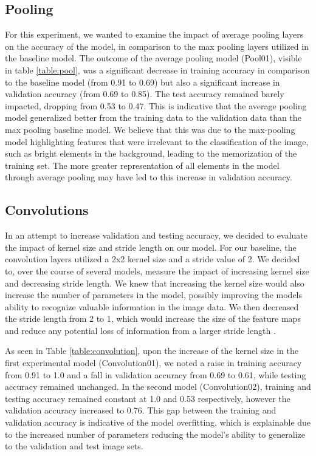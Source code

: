 \documentclass{article}
\begin{document}
\subsection{Pooling}

For this experiment, we wanted to examine the impact of average pooling layers on the accuracy of the model, in comparison to the max pooling layers utilized in the baseline model. The outcome of the average pooling model (Pool01), visible in table \ref{table:pool}, was a significant decrease in training accuracy in comparison to the baseline model (from 0.91 to 0.69) but also a significant increase in validation accuracy (from 0.69 to 0.85). The test accuracy remained barely impacted, dropping from 0.53 to 0.47. This is indicative that the average pooling model generalized better from the training data to the validation data than the max pooling baseline model. We believe that this was due to the max-pooling model highlighting features that were irrelevant to the classification of the image, such as bright elements in the background, leading to the memorization of the training set. The more greater representation of all elements in the model through average pooling may have led to this increase in validation accuracy.

\subsection{Convolutions}

In an attempt to increase validation and testing accuracy, we decided to evaluate the impact of kernel size and stride length on our model. For our baseline, the convolution layers utilized a 2x2 kernel size and a stride value of 2. We decided to, over the course of several models, measure the impact of increasing kernel size and decreasing stride length. We knew that increasing the kernel size would also increase the number of parameters in the model, possibly improving the models ability to recognize valuable information in the image data. We then decreased the stride length from 2 to 1, which would increase the size of the feature maps and reduce any potential loss of information from a larger stride length \cite{Goodfellow-et-al-2016}.

As seen in Table \ref{table:convolution}, upon the increase of the kernel size in the first experimental model (Convolution01), we noted a raise in training accuracy from 0.91 to 1.0 and a fall in validation accuracy from 0.69 to 0.61, while testing accuracy remained unchanged. In the second model (Convolution02), training and testing accuracy remained constant at 1.0 and 0.53 respectively, however the validation accuracy increased to 0.76. This gap between the training and validation accuracy is indicative of the model overfitting, which is explainable due to the increased number of parameters reducing the model's ability to generalize to the validation and test image sets.
\end{document}

